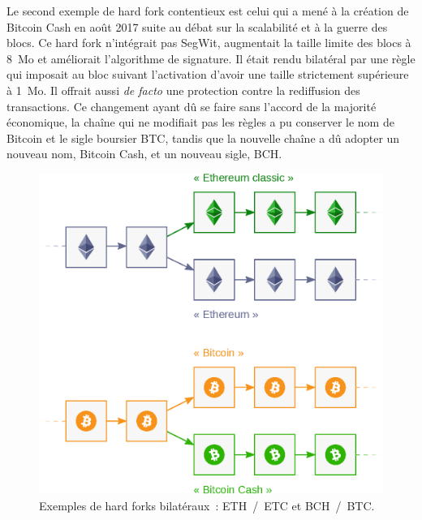 Le second exemple de hard fork contentieux est celui qui a mené à la création de Bitcoin Cash en août 2017 suite au débat sur la scalabilité et à la guerre des blocs. Ce hard fork n'intégrait pas SegWit, augmentait la taille limite des blocs à 8~Mo et améliorait l'algorithme de signature. Il était rendu bilatéral par une règle qui imposait au bloc suivant l'activation d'avoir une taille strictement supérieure à 1~Mo. Il offrait aussi \emph{de facto} une protection contre la rediffusion des transactions. Ce changement ayant dû se faire sans l'accord de la majorité économique, la chaîne qui ne modifiait pas les règles a pu conserver le nom de Bitcoin et le sigle boursier BTC, tandis que la nouvelle chaîne a dû adopter un nouveau nom, Bitcoin Cash, et un nouveau sigle, BCH.

\begin{figure}[h]
  \centering
  \includegraphics[scale=0.65]{img/hard-forks-eth-etc-bch-btc.eps}
  \caption{Exemples de hard forks bilatéraux~: ETH~/~ETC et BCH~/~BTC.}
  \label{fig:hard-forks-eth-bch}
\end{figure}

